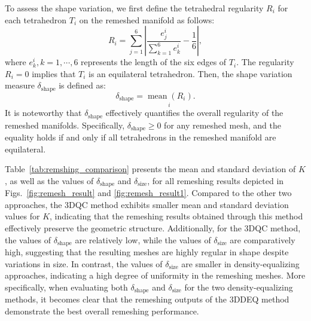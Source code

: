 \documentclass{article}
\begin{document}
To assess the shape variation, we first define the tetrahedral regularity $R_i$ for each tetrahedron $T_i$ on the remeshed manifold as follows:
\begin{equation}
    R_i = \sum^6_{j = 1}|\frac{e^i_j}{\sum^6_{k = 1}e^i_k} - \frac{1}{6}|,
\end{equation}
where $e^i_k,k = 1,\cdots,6$ represents the length of the six edges of $T_i$. The regularity $R_i = 0$ implies that $T_i$ is an equilateral tetrahedron. Then, the shape variation measure $\delta_{\text{shape}}$ is defined as:
\begin{equation}
    \delta_{\text{shape}} =\underset{i}{ \operatorname{mean}\left(R_i \right)}.
\end{equation}
It is noteworthy that $ \delta_{\text{shape}}$ effectively quantifies the overall regularity of the remeshed manifolds. Specifically, $\delta_{\text{shape}} \geq 0$ for any remeshed mesh, and the equality holds if and only if all tetrahedrons in the remeshed manifold are equilateral.

Table~\ref{tab:remshing_comparison} presents the mean and standard deviation of $K$, as well as the values of $\delta_{\text{shape}}$ and $\delta_{\text{size}}$, for all remeshing results depicted in Figs.~\ref{fig:remesh_result} and \ref{fig:remesh_result1}. Compared to the other two approaches, the 3DQC method exhibits smaller mean and standard deviation values for $K$, indicating that the remeshing results obtained through this method effectively preserve the geometric structure. Additionally, for the 3DQC method, the values of $\delta_{\text{shape}}$ are relatively low, while the values of $\delta_{\text{size}}$ are comparatively high, suggesting that the resulting meshes are highly regular in shape despite variations in size.
In contrast, the values of $\delta_{\text{size}}$ are smaller in density-equalizing approaches, indicating a high degree of uniformity in the remeshing meshes. More specifically, when evaluating both $\delta_{\text{shape}}$ and $\delta_{\text{size}}$ for the two density-equalizing methods, it becomes clear that the remeshing outputs of the 3DDEQ method demonstrate the best overall remeshing performance.
\end{document}
